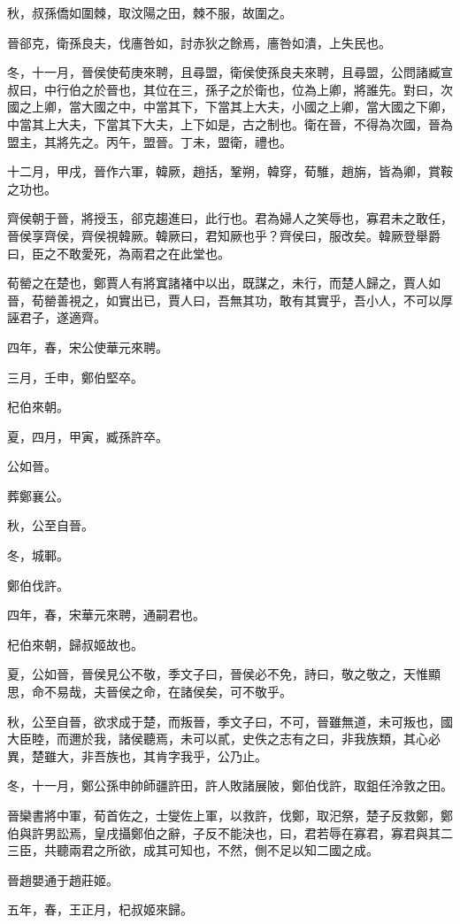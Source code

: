 \begin{pinyinscope}
秋，叔孫僑如圍棘，取汶陽之田，棘不服，故圍之。

晉郤克，衛孫良夫，伐廧咎如，討赤狄之餘焉，廧咎如潰，上失民也。

冬，十一月，晉侯使荀庚來聘，且尋盟，衛侯使孫良夫來聘，且尋盟，公問諸臧宣叔曰，中行伯之於晉也，其位在三，孫子之於衛也，位為上卿，將誰先。對曰，次國之上卿，當大國之中，中當其下，下當其上大夫，小國之上卿，當大國之下卿，中當其上大夫，下當其下大夫，上下如是，古之制也。衛在晉，不得為次國，晉為盟主，其將先之。丙午，盟晉。丁未，盟衛，禮也。

十二月，甲戌，晉作六軍，韓厥，趙括，鞏朔，韓穿，荀騅，趙旃，皆為卿，賞鞍之功也。

齊侯朝于晉，將授玉，郤克趨進曰，此行也。君為婦人之笑辱也，寡君未之敢任，晉侯享齊侯，齊侯視韓厥。韓厥曰，君知厥也乎？齊侯曰，服改矣。韓厥登舉爵曰，臣之不敢愛死，為兩君之在此堂也。

荀罃之在楚也，鄭賈人有將窴諸褚中以出，既謀之，未行，而楚人歸之，賈人如晉，荀罃善視之，如實出已，賈人曰，吾無其功，敢有其實乎，吾小人，不可以厚誣君子，遂適齊。

四年，春，宋公使華元來聘。

三月，壬申，鄭伯堅卒。

杞伯來朝。

夏，四月，甲寅，臧孫許卒。

公如晉。

葬鄭襄公。

秋，公至自晉。

冬，城鄆。

鄭伯伐許。

四年，春，宋華元來聘，通嗣君也。

杞伯來朝，歸叔姬故也。

夏，公如晉，晉侯見公不敬，季文子曰，晉侯必不免，詩曰，敬之敬之，天惟顯思，命不易哉，夫晉侯之命，在諸侯矣，可不敬乎。

秋，公至自晉，欲求成于楚，而叛晉，季文子曰，不可，晉雖無道，未可叛也，國大臣睦，而邇於我，諸侯聽焉，未可以貳，史佚之志有之曰，非我族類，其心必異，楚雖大，非吾族也，其肯字我乎，公乃止。

冬，十一月，鄭公孫申帥師疆許田，許人敗諸展陂，鄭伯伐許，取鉏任泠敦之田。

晉欒書將中軍，荀首佐之，士燮佐上軍，以救許，伐鄭，取汜祭，楚子反救鄭，鄭伯與許男訟焉，皇戌攝鄭伯之辭，子反不能決也，曰，君若辱在寡君，寡君與其二三臣，共聽兩君之所欲，成其可知也，不然，側不足以知二國之成。

晉趙嬰通于趙莊姬。

五年，春，王正月，杞叔姬來歸。


\end{pinyinscope}
